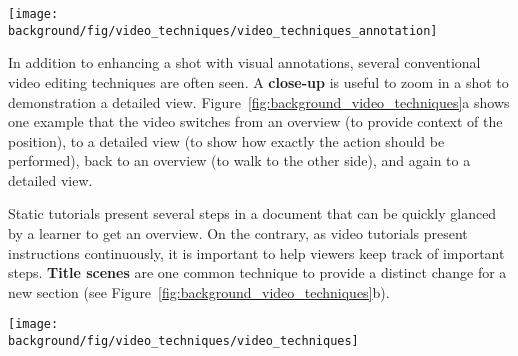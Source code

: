 \begin{table*}[!htbp]
  \centering
  \texttt{[image: \\background/fig/video\_techniques/video\_techniques\_annotation]}
  \begin{minipage}{\textwidth}
  \caption[Example annotation techniques used in a video tutorial.]{
    Example annotation techniques used in a video tutorial\footnote{``How to use Loola 3 stroller'' by Maxi-Cosi, \url{https://youtu.be/p6MzLXeWBJw}, licensed under CC BY 2.0}.
  }
  \label{background_video_annotation_techniques}
  \end{minipage}
\end{table*}

In addition to enhancing a shot with visual annotations, several conventional video editing techniques are often seen. A \textbf{close-up} is useful to zoom in a shot to demonstration a detailed view. Figure~\ref{fig:background_video_techniques}a shows one example that the video switches from an overview (to provide context of the position), to a detailed view (to show how exactly the action should be performed), back to an overview (to walk to the other side), and again to a detailed view.

Static tutorials present several steps in a document that can be quickly glanced by a learner to get an overview. On the contrary, as video tutorials present instructions continuously, it is important to help viewers keep track of important steps. \textbf{Title scenes} are one common technique to provide a distinct change for a new section (see Figure~\ref{fig:background_video_techniques}b).

\begin{figure*}[h!]
  \centering
  \texttt{[image: \\background/fig/video\_techniques/video\_techniques]}
  \begin{minipage}{\textwidth}
  \caption[Example video editing techniques used in a video tutorial.]{
    Example video editing techniques used in a video tutorial\footnote{``How to use Loola 3 stroller'' by Maxi-Cosi, \url{https://youtu.be/p6MzLXeWBJw}, licensed under CC BY 2.0}:
    (a) a sequence of overview and detailed shots, and
    (b) a title scene to introduce a new section, which can include animation or movement as a preview.
  }
  \label{fig:background_video_techniques}
  \end{minipage}
\end{figure*}


